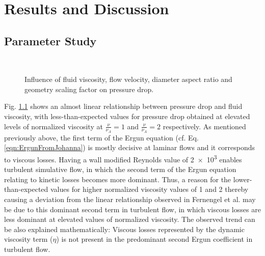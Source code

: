 \chapter{Results and Discussion}
\label{ch:05_Results_Discussion}
\section{Parameter Study} \label{section:ParameterStudy}
\begin{figure} [H]
	\begin{subfigure}{0.45\columnwidth}%
		\centering
		
				\label{fig:SPSRViscosity}
	\end{subfigure}
	\hfill
	\begin{subfigure}{0.45\columnwidth}%
		\centering
		\label{fig:SPSRVelocity}
	\end{subfigure} \\ 
	
	\begin{subfigure}{0.45\columnwidth}%
		\centering
						\label{fig:SPSRDiameterAspect}
	\end{subfigure}
	\hfill
	\begin{subfigure}{0.45\columnwidth}%
		\centering
						\label{fig:SPSRScalingFactor}
	\end{subfigure}
	
	\caption{Influence of fluid viscosity, flow velocity, diameter aspect ratio and geometry scaling factor on pressure drop.}%
	\label{fig:SPSR-p_parameter-study}	
\end{figure}
\newpage
Fig. \ref{fig:SPSRViscosity} shows an almost linear relationship between pressure drop and fluid viscosity, with less-than-expected values for pressure drop obtained at elevated levels of normalized viscosity at $\frac{\nu}{\nu_A} = 1$ and $\frac{\nu}{\nu_A} = 2$ respectively. As mentioned previously above, the first term of the Ergun equation (cf. Eq. \ref{eqn:ErgunFromJohanna}) is mostly decisive at laminar flows and it corresponds to viscous losses. Having a wall modified Reynolds value of \num{2e3} enables turbulent simulative flow, in which the second term of the Ergun equation relating to kinetic losses becomes more dominant. Thus, a reason for the lower-than-expected values for higher normalized viscosity values of 1 and 2 thereby causing a deviation from the linear relationship observed in Fernengel et al. \cite{Fernengel2020} may be due to this dominant second term in turbulent flow, in which viscous losses are less dominant at elevated values of normalized viscosity. The observed trend can be also explained mathematically: Viscous losses represented by the dynamic viscosity term ($\eta$) is not present in the predominant second Ergun coefficient in turbulent flow.
